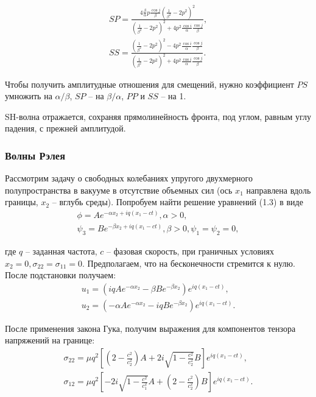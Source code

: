\begin{eqnarray}
SP = \frac{ 4\frac{\beta}{\alpha}p\frac{\cos{j}}{\beta}(\frac{1}{\beta^2} - 2p^2)^2 }{ (\frac{1}{\beta^2} - 2p^2)^2 + 4p^2\frac{\cos{i}}{\alpha}\frac{\cos{j}}{\beta} }, \\
SS = \frac{ (\frac{1}{\beta^2} - 2p^2)^2 - 4p^2\frac{\cos{i}}{\alpha}\frac{\cos{j}}{\beta} }{ (\frac{1}{\beta^2} - 2p^2)^2 + 4p^2\frac{\cos{i}}{\alpha}\frac{\cos{j}}{\beta} }.
\end{eqnarray}

Чтобы получить амплитудные отношения для смещений, нужно коэффициент $PS$ умножить на $\alpha/\beta$, $SP$ -- на $\beta/\alpha$, $PP$ и $SS$ -- на 1.

SH-волна отражается, сохраняя прямолинейность фронта, под углом, равным углу падения, с прежней амплитудой.


\subsubsection{Волны Рэлея}

Рассмотрим задачу о свободных колебаниях упругого двухмерного полупространства в вакууме в отсутствие объемных сил (ось $x_1$ направлена вдоль границы, $x_2$ -- вглубь среды). Попробуем найти решение уравнений (1.3) в виде
\begin{eqnarray}
\phi = Ae^{-\alpha x_2 + iq(x_1-ct)}, \alpha > 0, \\
\psi_3 = Be^{-\beta x_2 + iq(x_1-ct)}, \beta > 0, \psi_1 = \psi_2 = 0,
\end{eqnarray}

где $q$ -- заданная частота, $c$ -- фазовая скорость, при граничных условиях $x_2 = 0, \sigma_{22} = \sigma_{11} = 0$. Предполагаем, что на бесконечности стремится к нулю. После подстановки получаем:
\begin{eqnarray}
u_1 = (iq Ae^{-\alpha x_2} - \beta Be^{-\beta x_2}) e^{iq(x_1-ct)}, \\
u_2 = (-\alpha Ae^{-\alpha x_2} - iq Be^{-\beta x_2}) e^{iq(x_1-ct)}.
\end{eqnarray}

После применения закона Гука, получим выражения для компонентов тензора напряжений на границе:
\begin{eqnarray}
\sigma_{22} = \mu q^2 [ (2-\frac{c^2}{c_2^2})A + 2i\sqrt{1-\frac{c^2}{c_2^2}}B ] e^{iq(x_1-ct)}, \\
\sigma_{12} = \mu q^2 [ -2i\sqrt{1-\frac{c^2}{c_1^2}}A + (2-\frac{c^2}{c_2^2})B ] e^{iq(x_1-ct)}.
\end{eqnarray}

